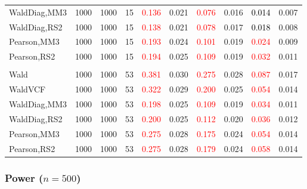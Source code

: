 \documentclass[
]{article}
\begin{document}
\begin{table}[H]
{\begin{tabular}[t]{lrrrrrrlrr}
\hspace{1em}WaldDiag,MM3 & 1000 & 1000 & 15 & \textcolor{red}{0.136} & 0.021 & \textcolor{red}{0.076} & 0.016 & \textcolor{black}{0.014} & 0.007\\
\hspace{1em}WaldDiag,RS2 & 1000 & 1000 & 15 & \textcolor{red}{0.138} & 0.021 & \textcolor{red}{0.078} & 0.017 & \textcolor{black}{0.018} & 0.008\\
\hspace{1em}Pearson,MM3 & 1000 & 1000 & 15 & \textcolor{red}{0.193} & 0.024 & \textcolor{red}{0.101} & 0.019 & \textcolor{red}{0.024} & 0.009\\
\hspace{1em}Pearson,RS2 & 1000 & 1000 & 15 & \textcolor{red}{0.194} & 0.025 & \textcolor{red}{0.109} & 0.019 & \textcolor{red}{0.032} & 0.011\\
\addlinespace[0.3em]
\multicolumn{10}{l}{\textbf{3F 15V}}\\
\hspace{1em}Wald & 1000 & 1000 & 53 & \textcolor{red}{0.381} & 0.030 & \textcolor{red}{0.275} & 0.028 & \textcolor{red}{0.087} & 0.017\\
\hspace{1em}WaldVCF & 1000 & 1000 & 53 & \textcolor{red}{0.322} & 0.029 & \textcolor{red}{0.200} & 0.025 & \textcolor{red}{0.054} & 0.014\\
\hspace{1em}WaldDiag,MM3 & 1000 & 1000 & 53 & \textcolor{red}{0.198} & 0.025 & \textcolor{red}{0.109} & 0.019 & \textcolor{red}{0.034} & 0.011\\
\hspace{1em}WaldDiag,RS2 & 1000 & 1000 & 53 & \textcolor{red}{0.200} & 0.025 & \textcolor{red}{0.112} & 0.020 & \textcolor{red}{0.036} & 0.012\\
\hspace{1em}Pearson,MM3 & 1000 & 1000 & 53 & \textcolor{red}{0.275} & 0.028 & \textcolor{red}{0.175} & 0.024 & \textcolor{red}{0.054} & 0.014\\
\hspace{1em}Pearson,RS2 & 1000 & 1000 & 53 & \textcolor{red}{0.275} & 0.028 & \textcolor{red}{0.179} & 0.024 & \textcolor{red}{0.058} & 0.014\\
\bottomrule
\end{tabular}}
\endgroup{}
\end{table}

\hypertarget{power-n500-1}{%
\subsubsection{\texorpdfstring{Power
(\(n=500\))}{Power (n=500)}}\label{power-n500-1}}
\end{document}
